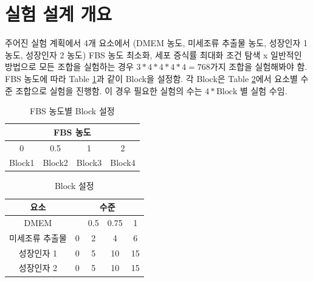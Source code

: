 \documentclass{article}
\author{lichen}
\date{\today}
\begin{document}
    \section{실험 설계 개요}
    주어진 실험 계획에서 4개 요소에서 (DMEM 농도, 미세조류 추출물 농도, 성장인자 1 농도, 성장인자 2 농도)
    FBS 농도 최소화, 세포 증식률 최대화 조건 탐색 x
    일반적인 방법으로 모든 조합을 실험하는 경우 $3*4*4*4*4 = 768$가지 조합을 실험해봐야 함.\\
    FBS 농도에 따라 Table \ref{table1}과 같이 Block을 설정함. 각 Block은 Table \ref{table2}에서 요소별 수준 조합으로 실험을 진행함.
    이 경우 필요한 실험의 수는 $4*\text{Block 별 실험 수}$임.
    \begin{table}[h]
        \centering
        \begin{tabular}{|c c c c|}
            \multicolumn{4}{|c|}{FBS 농도}\\
            \hline
            0 & 0.5 & 1 & 2\\
            Block1 & Block2 & Block3 & Block4\\
        \end{tabular}
        \caption{ FBS 농도별 Block 설정}
        \label{table1}
    \end{table}
    \begin{table}[h]
        \centering
        \begin{tabular}{|c c c c c|}
            요소&\multicolumn{4}{|c|}{수준}\\
            \hline
            DMEM &  & 0.5 & 0.75 & 1 \\
            미세조류 추출물 & 0 & 2 & 4 & 6 \\
            성장인자 1 & 0 & 5 & 10 & 15 \\
            성장인자 2 &  0 & 5 & 10 & 15 \\ 
        \end{tabular}
        \caption{ Block 설정}
        \label{table2}
    \end{table}
    \newpage
\end{document}
